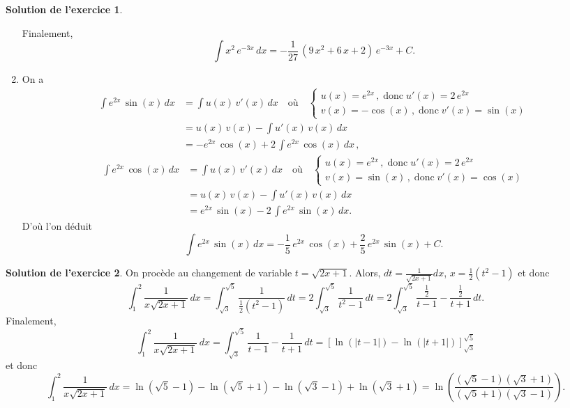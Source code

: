 \documentclass[a4paper, 11pt,openany]{article}%
\theoremstyle{plain}
\theoremstyle{definition}
\newtheorem{exo}{Exercice}
\newtheorem{sol}{Solution de l'exercice}
\theoremstyle{remark}
\begin{document}
\begin{sol}
\begin{enumerate}
Finalement, 
\[
\int x^2\,e^{-3x}\, dx =-\frac{1}{27}\,(9\,x^2+6\,x+2)\, e^{-3x}+C.
\]
\item On a
\begin{align*}\int e^{2x}\, \sin(x)\, dx &= \int u(x)\, v'(x)\, dx \quad \text{où}\quad \begin{cases}
 u(x)=e^{2x}\,,\;\text{donc}\; u'(x)=2\,e^{2x} \\
 v(x)=-\cos(x)\,,\;\text{donc}\;v'(x)=\sin(x)\end{cases}\\
&=u(x)\,v(x)-\int u'(x)\, v(x)\, dx\\
&= - e^{2x}\,\cos(x) +2\, \int e^{2x}\, \cos(x) \,dx\,,
\end{align*}
\begin{align*}\int e^{2x}\, \cos(x)\, dx &= \int u(x)\, v'(x)\, dx \quad \text{où}\quad \begin{cases}
 u(x)=e^{2x}\,,\;\text{donc}\; u'(x)=2\,e^{2x} \\
 v(x)=\sin(x)\,,\;\text{donc}\;v'(x)=\cos(x)\end{cases}\\
&=u(x)\,v(x)-\int u'(x)\, v(x)\, dx\\
&=  e^{2x}\,\sin(x) -2\, \int e^{2x}\, \sin(x) \,dx.
\end{align*}
D'où l'on déduit
\[
\int e^{2x}\, \sin(x)\,
dx=-\frac{1}{5}\,e^{2x}\,\cos(x)+\frac{2}{5}\,e^{2x}\,\sin(x)+C.
\]
\end{enumerate}
\end{sol}



\begin{sol}
On procède au changement de variable $t = \sqrt{2x +1}$. Alors, $dt = \frac{1}{\sqrt{2x +1}}dx$, $x= \frac{1}{2}(t^2 - 1)$ et donc 
\[  \int_1^2 \frac{1}{x \sqrt{2x+1}} \, dx = 
\int_{\sqrt{3}}^{\sqrt{5}} \frac{1}{\frac{1}{2}(t^2 - 1)}\, dt= 2 \int_{\sqrt{3}}^{\sqrt{5}} \frac{1}{t^2 - 1}\, dt  = 2 \int_{\sqrt{3}}^{\sqrt{5}} \frac{\frac{1}{2}}{t - 1} - \frac{\frac{1}{2}}{t+1} \, dt.\]
Finalement,
\[  \int_1^2 \frac{1}{x \sqrt{2x+1}} \, dx =\int_{\sqrt{3}}^{\sqrt{5}} \frac{1}{t - 1} - \frac{1}{t+1} \, dt = [ \ln(|t-1|) - \ln(|t+1|)]_{\sqrt{3}}^{\sqrt{5}}\]
et donc 
\[  \int_1^2 \frac{1}{x \sqrt{2x+1}} \, dx = \ln(\sqrt{5}-1) - \ln(\sqrt{5}+1) - \ln(\sqrt{3}-1) + \ln(\sqrt{3}+1) = \ln \left( \frac{(\sqrt{5}-1)(\sqrt{3}+1)}{(\sqrt{5}+1)(\sqrt{3}-1)} \right).\]
\end{sol}
\end{document}
